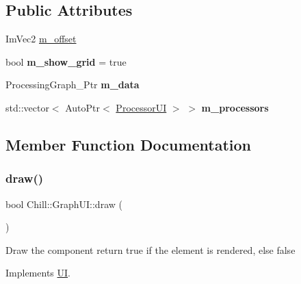 \subsection*{Public Attributes}
\begin{DoxyCompactItemize}
\item 
Im\+Vec2 \mbox{\hyperlink{class_chill_1_1_graph_u_i_a923428629a957d077fedc0ccd83b4cb1}{m\+\_\+offset}}
\item 
\mbox{\label{class_chill_1_1_graph_u_i_a515b613dade1ae1eb12a7b4ea976c100}} 
bool {\bfseries m\+\_\+show\+\_\+grid} = true
\item 
\mbox{\label{class_chill_1_1_graph_u_i_a68fad7908c8e93e55925a0fb6a3ac097}} 
Processing\+Graph\+\_\+\+Ptr {\bfseries m\+\_\+data}
\item 
\mbox{\label{class_chill_1_1_graph_u_i_a97597328754e82ccc1324fbf897dcc8d}} 
std\+::vector$<$ Auto\+Ptr$<$ \mbox{\hyperlink{class_chill_1_1_processor_u_i}{Processor\+UI}} $>$ $>$ {\bfseries m\+\_\+processors}
\end{DoxyCompactItemize}


\subsection{Member Function Documentation}
\mbox{\label{class_chill_1_1_graph_u_i_a0baf2bbeaab0062cee7f3b7d2136bced}} 
\subsubsection{\texorpdfstring{draw()}{draw()}}
{\footnotesize\ttfamily bool Chill\+::\+Graph\+U\+I\+::draw (\begin{DoxyParamCaption}{ }\end{DoxyParamCaption})\hspace{0.3cm}{\ttfamily [virtual]}}

Draw the component return true if the element is rendered, else false 

Implements \mbox{\hyperlink{class_u_i_a5025b88e26f21852c0cd2e4b42675c50}{UI}}.



